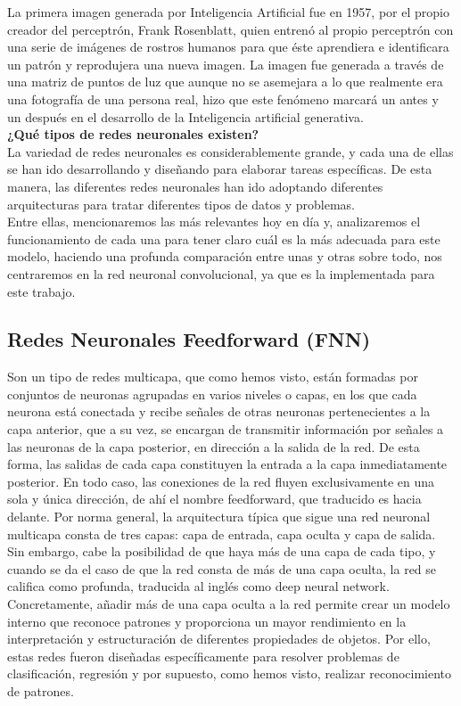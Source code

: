La primera imagen generada por Inteligencia Artificial fue en 1957, por el propio creador del perceptrón, Frank Rosenblatt, quien entrenó al propio perceptrón con una serie de imágenes de rostros humanos para que éste aprendiera e identificara un patrón y reprodujera una nueva imagen. La imagen fue generada a través de una matriz de puntos de luz que aunque no se asemejara a lo que realmente era una fotografía de una persona real, hizo que este fenómeno marcará un antes y un después en el desarrollo de la Inteligencia artificial generativa.\\

\textbf{¿Qué tipos de redes neuronales existen?}\\

La variedad de redes neuronales es considerablemente grande, y cada una de ellas se han ido desarrollando y diseñando para elaborar tareas específicas. De esta manera, las diferentes redes neuronales han ido adoptando diferentes arquitecturas para tratar diferentes tipos de datos y problemas.\\
Entre ellas, mencionaremos las más relevantes hoy en día y, analizaremos el funcionamiento de cada una para tener claro cuál es la más adecuada para este modelo, haciendo una profunda comparación entre unas y otras sobre todo, nos centraremos en la red neuronal convolucional, ya que es la implementada para este trabajo.

\subsection{Redes Neuronales Feedforward (FNN)}

Son un tipo de redes multicapa, que como hemos visto, están formadas por conjuntos de neuronas agrupadas en varios niveles o capas, en los que cada neurona está conectada y recibe señales de otras neuronas pertenecientes a la capa anterior, que a su vez, se encargan de transmitir información por señales a las neuronas de la capa posterior, en dirección a la salida de la red. De esta forma, las salidas de cada capa constituyen la entrada a la capa inmediatamente posterior. En todo caso, las conexiones de la red fluyen exclusivamente en una sola y única dirección, de ahí el nombre feedforward, que traducido es hacia delante. Por norma general, la arquitectura típica que sigue una red neuronal multicapa consta de tres capas: capa de entrada, capa oculta y capa de salida. \\

Sin embargo, cabe la posibilidad de que haya más de una capa de cada tipo, y cuando se da el caso de que la red consta de más de una capa oculta, la red se califica como profunda, traducida al inglés como deep neural network. Concretamente, añadir más de una capa oculta a la red permite crear un modelo interno que reconoce patrones y proporciona un mayor rendimiento en la interpretación y estructuración de diferentes propiedades de objetos. Por ello, estas redes fueron diseñadas específicamente para resolver problemas de clasificación, regresión y por supuesto, como hemos visto, realizar reconocimiento de patrones.\\

